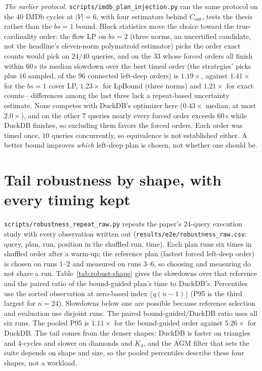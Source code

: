 \documentclass[11pt]{article}
\begin{document}
\emph{The earlier protocol.} \texttt{scripts/imdb\_plan\_injection.py} ran the same protocol on the $40$
IMDb cycles at $|V|{=}6$, with four estimators behind $C_{\mathrm{out}}$,
tests the thesis rather than the $bs{=}1$ bound. Block statistics move the
choice toward the true-cardinality order: the flow LP on $bs{=}2$ (three norms, an uncertified candidate, not the headline's eleven-norm polymatroid estimator) picks
the order exact counts would pick on $24/40$ queries, and on the $33$
whose forced orders all finish within $60$\,s its median slowdown over the
best timed order (the strategies' picks plus $16$ sampled, of the $96$
connected left-deep orders) is $1.19\times$, against $1.41\times$ for the
$bs{=}1$ cover LP, $1.23\times$ for LpBound (three norms) and $1.21\times$ for exact
counts---differences among the last three lack a repeat-based uncertainty estimate. None competes with DuckDB's optimizer here ($0.43\times$
median, at most $2.0\times$), and
on the other $7$ queries nearly every forced order exceeds
$60$\,s while DuckDB finishes, so excluding them favors the forced
orders. Each order was timed once, $10$ queries concurrently, so equivalence is not established either. A better bound improves
\emph{which} left-deep plan is chosen, not whether one should be.

\section{Tail robustness by shape, with every timing kept}
\texttt{scripts/robustness\_repeat\_raw.py} repeats the paper's
24-query execution study with every observation written out
(\texttt{results/e2e/robustness\_raw.csv}: query, plan, run, position in the
shuffled run, time). Each plan runs six times in shuffled order after a
warm-up; the reference plan (fastest forced left-deep order) is chosen on
runs $1$--$2$ and measured on runs $3$--$6$, so choosing and measuring do
not share a run. Table~\ref{tab:robust-shape} gives the slowdowns over that
reference and the paired ratio of the bound-guided plan's time to DuckDB's.
Percentiles use the sorted observation at zero-based index $\lfloor q(n-1)\rfloor$ (P95 is the third largest for $n=24$). Slowdowns below one are possible because reference selection and evaluation use disjoint runs. The paired bound-guided/DuckDB ratio uses all six runs. The pooled P95 is $1.11\times$ for the bound-guided order
against $5.26\times$ for DuckDB. The tail comes from the denser shapes: DuckDB is
faster on triangles and 4-cycles and slower on diamonds and $K_4$, and the
AGM filter that sets the suite depends on shape and size, so the pooled
percentiles describe these four shapes, not a workload.
\end{document}

